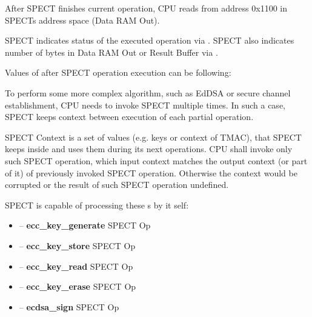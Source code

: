After SPECT finishes current operation, CPU reads  from address \linebreak
0x1100 in SPECTs address space (Data RAM Out).




SPECT indicates status of the executed operation via . SPECT also
indicates number of bytes in Data RAM Out or Result Buffer via \linebreak {}.

\vspace{.3cm}

\clearpage
Values of  after SPECT operation execution can be following:



To perform some more complex algorithm, such as EdDSA or secure channel establishment,
CPU needs to invoke SPECT multiple times. In such a case, SPECT keeps context between
execution of each partial operation.

SPECT Context is a set of values (e.g. keys or context of TMAC), that SPECT keeps inside
and uses them during its next operations. CPU shall invoke only such SPECT operation,
which input context matches the output context (or part of it) of previously invoked
SPECT operation. Otherwise the context would be corrupted or the result of such SPECT
operation undefined.

SPECT is capable of processing these \LLLCMD{}s by it self:
\begin{itemize}
    \item {} -- \textbf{ecc_key_generate} SPECT Op
    \item {} -- \textbf{ecc_key_store} SPECT Op
    \item {} -- \textbf{ecc_key_read} SPECT Op
    \item {} -- \textbf{ecc_key_erase} SPECT Op
    \item {} -- \textbf{ecdsa_sign} SPECT Op
\end{itemize}


